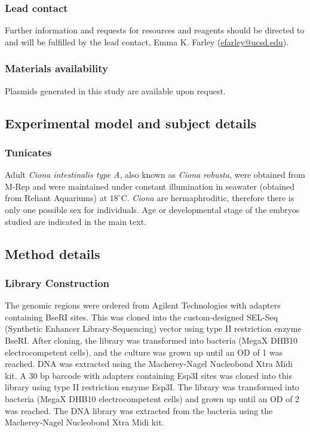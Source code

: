 \subsubsection{Lead contact} 
Further information and requests for resources and reagents should be directed to and will be fulfilled by the lead contact, Emma K. Farley (\href{mailto:efarley@ucsd.edu}{efarley@ucsd.edu}). 

\subsubsection{Materials availability} 
Plasmids generated in this study are available upon request. 

\subsection{Experimental model and subject details}
\subsubsection{Tunicates}
Adult \textit{\textit{Ciona} intestinalis type A}, also known as \textit{\textit{Ciona} robusta}, were obtained from M-Rep and were maintained under constant illumination in seawater (obtained from Reliant Aquariums) at $18^\circ$C. \textit{Ciona} are hermaphroditic, therefore there is only one possible sex for individuals. Age or developmental stage of the embryos studied are indicated in the main text. 

\subsection{Method details}
\subsubsection{Library Construction}
The genomic regions were ordered from Agilent Technologies with adapters containing BseRI sites. This was cloned into the custom-designed SEL-Seq (Synthetic Enhancer Library-Sequencing) vector using type II restriction enzyme BseRI. After cloning, the library was transformed into bacteria (MegaX DHB10 electrocompetent cells), and the culture was grown up until an OD of 1 was reached. DNA was extracted using the Macherey-Nagel Nucleobond Xtra Midi kit. A 30 bp barcode with adapters containing Esp3I sites was cloned into this library using type II restriction enzyme Esp3I. The library was transformed into bacteria (MegaX DHB10 electrocompetent cells) and grown up until an OD of 2 was reached. The DNA library was extracted from the bacteria using the Macherey-Nagel Nucleobond Xtra Midi kit. 


